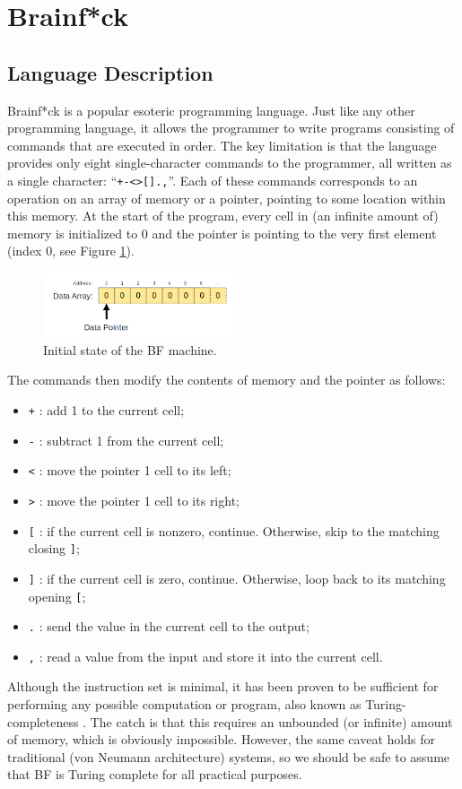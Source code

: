 \section{Brainf*ck}\label{sec:brainfck}
\subsection{Language Description}
Brainf*ck is a popular esoteric programming language. Just like any other programming language, it allows the programmer to write programs consisting of commands that are executed in order. The key limitation is that the language provides only eight single-character commands to the programmer, all written as a single character: ``\texttt{+-<>[].,}''. Each of these commands corresponds to an operation on an array of memory or a pointer, pointing to some location within this memory. At the start of the program, every cell in (an infinite amount of) memory is initialized to 0 and the pointer is pointing to the very first element (index 0, see Figure \ref{fig:bfmachine_initial}).
%
\begin{figure}[H]
  \centering
  \includegraphics[width=0.5\textwidth]{img/bfmachine_initial}
  \caption{Initial state of the BF machine.}
  \label{fig:bfmachine_initial}
\end{figure}
%
The commands then modify the contents of memory and the pointer as follows:
\begin{itemize}
\item \texttt{+} : add 1 to the current cell;
\item \texttt{-} : subtract 1 from the current cell;
\item \texttt{<} : move the pointer 1 cell to its left;
\item \texttt{>} : move the pointer 1 cell to its right;
\item \texttt{[} : if the current cell is nonzero, continue. Otherwise, skip to the matching closing \texttt{]};
\item \texttt{]} : if the current cell is zero, continue. Otherwise, loop back to its matching opening \texttt{[};
\item \texttt{.} : send the value in the current cell to the output;
\item \texttt{,} : read a value from the input and store it into the current cell.
\end{itemize}
Although the instruction set is minimal, it has been proven to be sufficient for performing any possible computation or program, also known as Turing-completeness \cite{esolang}. The catch is that this requires an unbounded (or infinite) amount of memory, which is obviously impossible. However, the same caveat holds for traditional (von Neumann architecture) systems, so we should be safe to assume that BF is Turing complete for all practical purposes.

